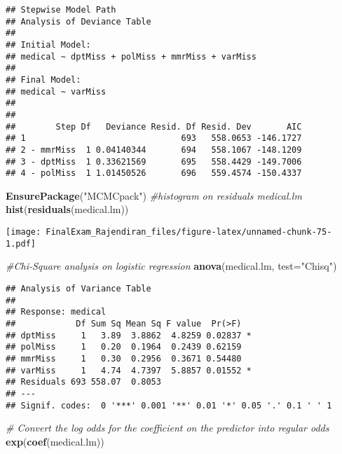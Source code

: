 \documentclass[]{article}
\newenvironment{Shaded}{\begin{snugshade}}{\end{snugshade}}
\newcommand{\CommentTok}[1]{\textcolor[rgb]{0.56,0.35,0.01}{\textit{#1}}}
\newcommand{\DataTypeTok}[1]{\textcolor[rgb]{0.13,0.29,0.53}{#1}}
\newcommand{\KeywordTok}[1]{\textcolor[rgb]{0.13,0.29,0.53}{\textbf{#1}}}
\newcommand{\NormalTok}[1]{#1}
\newcommand{\StringTok}[1]{\textcolor[rgb]{0.31,0.60,0.02}{#1}}
\begin{document}
\begin{verbatim}
## Stepwise Model Path 
## Analysis of Deviance Table
## 
## Initial Model:
## medical ~ dptMiss + polMiss + mmrMiss + varMiss
## 
## Final Model:
## medical ~ varMiss
## 
## 
##        Step Df   Deviance Resid. Df Resid. Dev       AIC
## 1                               693   558.0653 -146.1727
## 2 - mmrMiss  1 0.04140344       694   558.1067 -148.1209
## 3 - dptMiss  1 0.33621569       695   558.4429 -149.7006
## 4 - polMiss  1 1.01450526       696   559.4574 -150.4337
\end{verbatim}

\begin{Shaded}
\begin{Highlighting}[]
\KeywordTok{EnsurePackage}\NormalTok{(}\StringTok{"MCMCpack"}\NormalTok{)}
\CommentTok{#histogram on residuals medical.lm}
\KeywordTok{hist}\NormalTok{(}\KeywordTok{residuals}\NormalTok{(medical.lm))}
\end{Highlighting}
\end{Shaded}

\texttt{[image: FinalExam\_Rajendiran\_files/figure-latex/unnamed-chunk-75-1.pdf]}

\begin{Shaded}
\begin{Highlighting}[]
\CommentTok{#Chi-Square analysis on logistic regression}
\KeywordTok{anova}\NormalTok{(medical.lm, }\DataTypeTok{test=}\StringTok{"Chisq"}\NormalTok{)}
\end{Highlighting}
\end{Shaded}

\begin{verbatim}
## Analysis of Variance Table
## 
## Response: medical
##            Df Sum Sq Mean Sq F value  Pr(>F)  
## dptMiss     1   3.89  3.8862  4.8259 0.02837 *
## polMiss     1   0.20  0.1964  0.2439 0.62159  
## mmrMiss     1   0.30  0.2956  0.3671 0.54480  
## varMiss     1   4.74  4.7397  5.8857 0.01552 *
## Residuals 693 558.07  0.8053                  
## ---
## Signif. codes:  0 '***' 0.001 '**' 0.01 '*' 0.05 '.' 0.1 ' ' 1
\end{verbatim}

\begin{Shaded}
\begin{Highlighting}[]
\CommentTok{# Convert the log odds for the coefficient on the predictor into regular odds}
\KeywordTok{exp}\NormalTok{(}\KeywordTok{coef}\NormalTok{(medical.lm))}
\end{Highlighting}
\end{Shaded}
\end{document}
